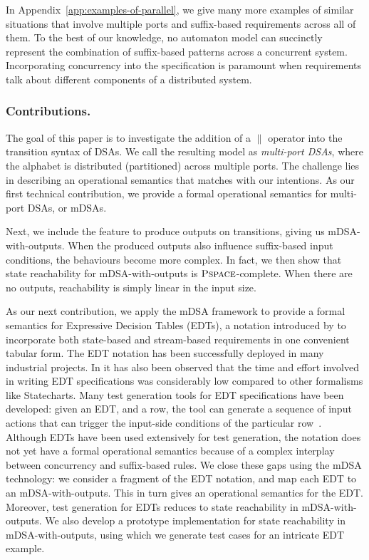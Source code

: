   In Appendix~\ref{app:examples-of-parallel}, we give many more examples of similar situations that involve multiple ports and suffix-based requirements across all of them. To the best of our knowledge, no automaton model can succinctly represent the combination of suffix-based patterns across a concurrent system. Incorporating concurrency into the specification is paramount when requirements talk about different components of a distributed system. 
  
  \subsubsection*{Contributions.} The goal of this paper is to investigate the
  addition of a $\parallel$ operator into the
  transition syntax of DSAs. We call the resulting model as \emph{multi-port
  DSAs}, where the alphabet is distributed (partitioned) across multiple ports.
  The challenge lies in describing an operational semantics that matches with
  our intentions. As our first technical contribution, we provide a formal
  operational semantics for multi-port DSAs, or mDSAs.
  
  Next, we include the feature to produce outputs on transitions, giving us mDSA-with-outputs. When the produced outputs also influence suffix-based input conditions, the behaviours become more complex. In fact, we then show that state reachability for mDSA-with-outputs is $\operatorname{\textsc{Pspace}}$-complete. When there are no outputs, reachability is simply linear in the input size. %

  As our next contribution, we apply the mDSA framework to provide a formal semantics for Expressive Decision Tables (EDTs), a notation introduced by \cite{DBLP:conf/date/VenkateshSKA14} to incorporate both state-based and stream-based requirements in one convenient tabular form. The EDT notation has been successfully deployed in many industrial projects. In \cite{DBLP:conf/date/VenkateshSKA14} it has also been observed that the time and effort involved in writing EDT specifications was considerably low compared to other formalisms like  Statecharts. Many test generation tools for EDT specifications have been developed: given an EDT, and a row, the tool can generate a sequence of input actions that can trigger the input-side conditions of the particular row~\cite{DBLP:conf/enase/VenkateshSZA15a,DBLP:conf/icst/AgrawalVSZV20}. %
  Although EDTs have been used extensively for test generation, the notation does not yet have a formal operational semantics because of a complex interplay between concurrency and suffix-based rules. We close these gaps using the mDSA technology: we consider a fragment of the EDT notation, and map each EDT to an mDSA-with-outputs. This in turn gives an operational semantics for the EDT. Moreover, test generation for EDTs reduces to state reachability in mDSA-with-outputs. We also develop a prototype implementation for state reachability in mDSA-with-outputs, using which we generate test cases for an intricate EDT example. 
  
